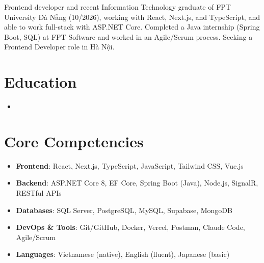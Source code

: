 \documentclass[10pt,a4paper,sans]{moderncv}
\begin{document}
\makecvtitle
\vspace{-22pt}

\small{Frontend developer and recent Information Technology graduate of FPT University Đà Nẵng (10/2026), working with React, Next.js, and TypeScript, and able to work full-stack with ASP.NET Core. Completed a Java internship (Spring Boot, SQL) at FPT Software and worked in an Agile/Scrum process. Seeking a Frontend Developer role in Hà Nội.}

\vspace{-4pt}
\section{Education}
\vspace{1pt}
\begin{itemize}
\item{}
\end{itemize}

\vspace{-4pt}
\section{Core Competencies}
\vspace{1pt}
\begin{itemize}
\item \textbf{Frontend}: React, Next.js, TypeScript, JavaScript, Tailwind CSS, Vue.js
\item \textbf{Backend}: ASP.NET Core 8, EF Core, Spring Boot (Java), Node.js, SignalR, RESTful APIs
\item \textbf{Databases}: SQL Server, PostgreSQL, MySQL, Supabase, MongoDB
\item \textbf{DevOps \& Tools}: Git/GitHub, Docker, Vercel, Postman, Claude Code, Agile/Scrum
\item \textbf{Languages}: Vietnamese (native), English (fluent), Japanese (basic)
\end{itemize}
\end{document}
